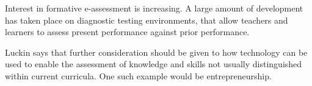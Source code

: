     Interest in formative e-assessment is increasing. A large amount of development has taken place on diagnostic testing environments, that allow teachers and learners to assess present performance against prior performance. \cite{luckin}

    Luckin says that further consideration should  be given to how technology can be used to enable the assessment of knowledge and skills not usually distinguished within current curricula. \cite{luckin} One such example would be entrepreneurship.

    
